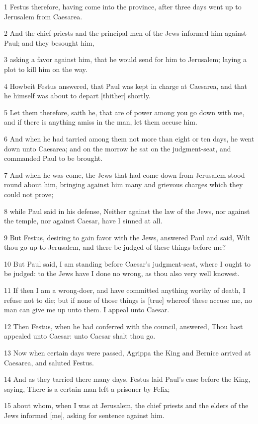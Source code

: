 \par 1 Festus therefore, having come into the province, after three days went up to Jerusalem from Caesarea.
\par 2 And the chief priests and the principal men of the Jews informed him against Paul; and they besought him,
\par 3 asking a favor against him, that he would send for him to Jerusalem; laying a plot to kill him on the way.
\par 4 Howbeit Festus answered, that Paul was kept in charge at Caesarea, and that he himself was about to depart [thither] shortly.
\par 5 Let them therefore, saith he, that are of power among you go down with me, and if there is anything amiss in the man, let them accuse him.
\par 6 And when he had tarried among them not more than eight or ten days, he went down unto Caesarea; and on the morrow he sat on the judgment-seat, and commanded Paul to be brought.
\par 7 And when he was come, the Jews that had come down from Jerusalem stood round about him, bringing against him many and grievous charges which they could not prove;
\par 8 while Paul said in his defense, Neither against the law of the Jews, nor against the temple, nor against Caesar, have I sinned at all.
\par 9 But Festus, desiring to gain favor with the Jews, answered Paul and said, Wilt thou go up to Jerusalem, and there be judged of these things before me?
\par 10 But Paul said, I am standing before Caesar's judgment-seat, where I ought to be judged: to the Jews have I done no wrong, as thou also very well knowest.
\par 11 If then I am a wrong-doer, and have committed anything worthy of death, I refuse not to die; but if none of those things is [true] whereof these accuse me, no man can give me up unto them. I appeal unto Caesar.
\par 12 Then Festus, when he had conferred with the council, answered, Thou hast appealed unto Caesar: unto Caesar shalt thou go.
\par 13 Now when certain days were passed, Agrippa the King and Bernice arrived at Caesarea, and saluted Festus.
\par 14 And as they tarried there many days, Festus laid Paul's case before the King, saying, There is a certain man left a prisoner by Felix;
\par 15 about whom, when I was at Jerusalem, the chief priests and the elders of the Jews informed [me], asking for sentence against him.
